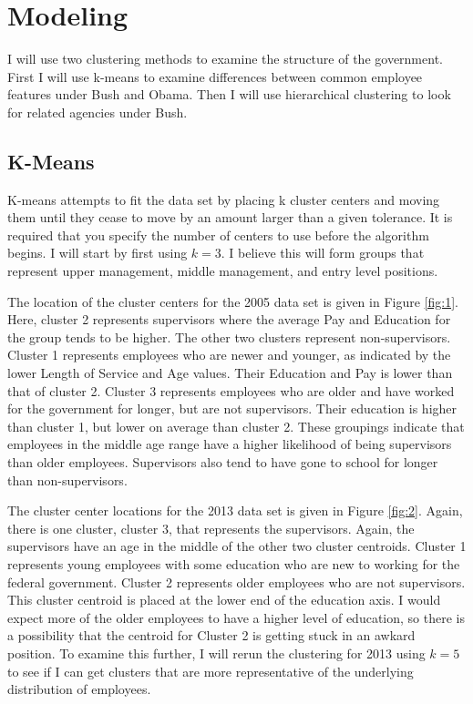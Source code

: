 \documentclass{article}
\begin{document}
\section{Modeling}
I will use two clustering methods to examine the structure of the government. First I will use k-means to examine differences between common employee features under Bush and Obama. Then I will use hierarchical clustering to look for related agencies under Bush.

    \subsection{K-Means}
    K-means attempts to fit the data set by placing k cluster centers and moving them until they cease to move by an amount larger than a given tolerance. It is required that you specify the number of centers to use before the algorithm begins. I will start by first using $k = 3$. I believe this will form groups that represent upper management, middle management, and entry level positions.
    \par
    The location of the cluster centers for the 2005 data set is given in Figure \ref{fig:1}. Here, cluster 2 represents supervisors where the average Pay and Education for the group tends to be higher. The other two clusters represent non-supervisors. Cluster 1 represents employees who are newer and younger, as indicated by the lower Length of Service and Age values. Their Education and Pay is lower than that of cluster 2. Cluster 3 represents employees who are older and have worked for the government for longer, but are not supervisors. Their education is higher than cluster 1, but lower on average than cluster 2. These groupings indicate that employees in the middle age range have a higher likelihood of being supervisors than older employees. Supervisors also tend to have gone to school for longer than non-supervisors.
    \par
    The cluster center locations for the 2013 data set is given in Figure \ref{fig:2}. Again, there is one cluster, cluster 3, that represents the supervisors. Again, the supervisors have an age in the middle of the other two cluster centroids. Cluster 1 represents young employees with some education who are new to working for the federal government. Cluster 2 represents older employees who are not supervisors. This cluster centroid is placed at the lower end of the education axis. I would expect more of the older employees to have a higher level of education, so there is a possibility that the centroid for Cluster 2 is getting stuck in an awkard position. To examine this further, I will rerun the clustering for 2013 using $k = 5$ to see if I can get clusters that are more representative of the underlying distribution of employees.
\end{document}
